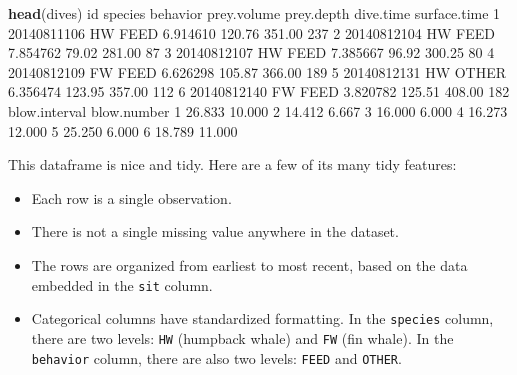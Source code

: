 \documentclass[]{book}
\newenvironment{Shaded}{\begin{snugshade}}{\end{snugshade}}
\newcommand{\DecValTok}[1]{\textcolor[rgb]{0.00,0.00,0.81}{#1}}
\newcommand{\FloatTok}[1]{\textcolor[rgb]{0.00,0.00,0.81}{#1}}
\newcommand{\KeywordTok}[1]{\textcolor[rgb]{0.13,0.29,0.53}{\textbf{#1}}}
\newcommand{\NormalTok}[1]{#1}
\begin{document}
\begin{Shaded}
\begin{Highlighting}[]
\KeywordTok{head}\NormalTok{(dives)}
\NormalTok{           id species behavior prey.volume prey.depth dive.time surface.time}
\DecValTok{1} \DecValTok{20140811106}\NormalTok{      HW     FEED    }\FloatTok{6.914610}     \FloatTok{120.76}    \FloatTok{351.00}          \DecValTok{237}
\DecValTok{2} \DecValTok{20140812104}\NormalTok{      HW     FEED    }\FloatTok{7.854762}      \FloatTok{79.02}    \FloatTok{281.00}           \DecValTok{87}
\DecValTok{3} \DecValTok{20140812107}\NormalTok{      HW     FEED    }\FloatTok{7.385667}      \FloatTok{96.92}    \FloatTok{300.25}           \DecValTok{80}
\DecValTok{4} \DecValTok{20140812109}\NormalTok{      FW     FEED    }\FloatTok{6.626298}     \FloatTok{105.87}    \FloatTok{366.00}          \DecValTok{189}
\DecValTok{5} \DecValTok{20140812131}\NormalTok{      HW    OTHER    }\FloatTok{6.356474}     \FloatTok{123.95}    \FloatTok{357.00}          \DecValTok{112}
\DecValTok{6} \DecValTok{20140812140}\NormalTok{      FW     FEED    }\FloatTok{3.820782}     \FloatTok{125.51}    \FloatTok{408.00}          \DecValTok{182}
\NormalTok{  blow.interval blow.number}
\DecValTok{1}        \FloatTok{26.833}      \FloatTok{10.000}
\DecValTok{2}        \FloatTok{14.412}       \FloatTok{6.667}
\DecValTok{3}        \FloatTok{16.000}       \FloatTok{6.000}
\DecValTok{4}        \FloatTok{16.273}      \FloatTok{12.000}
\DecValTok{5}        \FloatTok{25.250}       \FloatTok{6.000}
\DecValTok{6}        \FloatTok{18.789}      \FloatTok{11.000}
\end{Highlighting}
\end{Shaded}

This dataframe is nice and tidy. Here are a few of its many tidy features:

\begin{itemize}
\item
  Each row is a single observation.
\item
  There is not a single missing value anywhere in the dataset.
\item
  The rows are organized from earliest to most recent, based on the data embedded in the \texttt{sit} column.
\item
  Categorical columns have standardized formatting. In the \texttt{species} column, there are two levels: \texttt{HW} (humpback whale) and \texttt{FW} (fin whale). In the \texttt{behavior} column, there are also two levels: \texttt{FEED} and \texttt{OTHER}.
\end{itemize}
\end{document}
